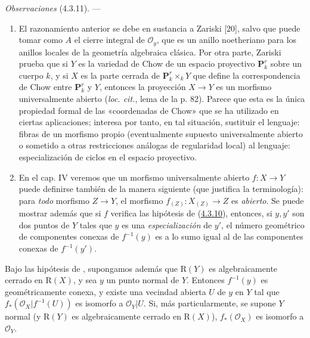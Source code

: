 \begin{env}[4.3.11]
\label{III.4.3.11-fr}
\emph{Observaciones} (4.3.11). ---
\begin{enumerate}
\item[(i)] El razonamiento anterior se debe en sustancia a Zariski [20],
salvo que puede tomar como $A$ el cierre integral de
$\mathcal O_y$, que es un anillo noetheriano para los anillos locales
de la geometría algebraica clásica. Por otra parte, Zariski prueba que si
$Y$ es la variedad de Chow de un espacio proyectivo $\mathbf P_k^r$ sobre un
cuerpo $k$, y si $X$ es la parte cerrada de $\mathbf P_k^r\times_kY$ que
define la correspondencia de Chow entre $\mathbf P_k^r$ y $Y$, entonces la
proyección $X\to Y$ es un morfismo universalmente abierto
(\emph{loc. cit.}, lema de la p. 82). Parece que esta es la única
propiedad formal de las «coordenadas de Chow» que se ha utilizado en
ciertas aplicaciones; interesa por tanto, en tal situación,
sustituir el lenguaje: fibras de un morfismo propio (eventualmente
supuesto universalmente abierto o sometido a otras restricciones análogas
de regularidad local) al lenguaje: especialización de ciclos en el espacio
proyectivo.

\item[(ii)] En el cap. IV veremos que un morfismo universalmente abierto
$f:X\to Y$ puede definirse también de la manera siguiente (que justifica la
terminología): para \emph{todo} morfismo $Z\to Y$, el morfismo
$f_{(Z)}:X_{(Z)}\to Z$ es \emph{abierto}. Se puede mostrar además que si $f$
verifica las hipótesis de (\hyperref[III.4.3.10-fr]{4.3.10}), entonces, si
$y,y'$ son dos puntos de $Y$ tales que $y$ es una \emph{especialización} de $y'$,
el número geométrico de componentes conexas de $f^{-1}(y)$ es a lo sumo
igual al de las componentes conexas de $f^{-1}(y')$.
\end{enumerate}
\end{env}

\begin{corollary}[4.3.12]
\label{III.4.3.12}
\label{III.4.3.12-fr}
Bajo las hipótesis de \textup{}, supongamos además que
$\mathrm R(Y)$ es algebraicamente cerrado en $\mathrm R(X)$, y sea
$y$ un punto normal de $Y$. Entonces $f^{-1}(y)$ es geométricamente
conexa, y existe una vecindad abierta $U$ de $y$ en $Y$ tal que
$f_*(\mathcal O_X|f^{-1}(U))$ es isomorfo a $\mathcal O_Y|U$. Si, más
particularmente, se supone $Y$ normal (y $\mathrm R(Y)$ es algebraicamente
cerrado en $\mathrm R(X)$), $f_*(\mathcal O_X)$ es isomorfo a
$\mathcal O_Y$.
\end{corollary}

